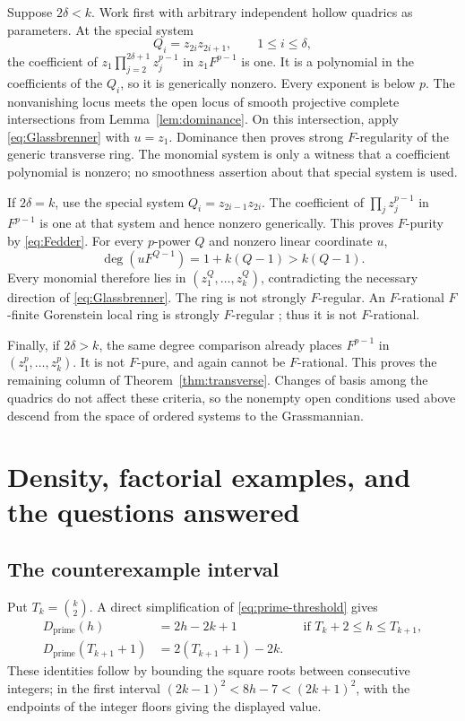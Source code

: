 \documentclass[11pt]{article}
\theoremstyle{definition}
\theoremstyle{remark}
\numberwithin{equation}{section}
\newcommand{\Dpr}{D_{\mathrm{prime}}}
\begin{document}
Suppose $2\delta<k$. Work first with arbitrary independent hollow
quadrics as parameters. At the special system
\[
 Q_i=z_{2i}z_{2i+1},\qquad 1\leq i\leq\delta,
\]
the coefficient of
$z_1\prod_{j=2}^{2\delta+1}z_j^{p-1}$ in $z_1F^{p-1}$ is one.
It is a polynomial in the coefficients of the $Q_i$, so it is
generically nonzero. Every exponent is below $p$. The nonvanishing
locus meets the open locus of smooth projective complete intersections
from Lemma~\ref{lem:dominance}. On this intersection, apply
\eqref{eq:Glassbrenner} with $u=z_1$. Dominance then proves strong
$F$-regularity of the generic transverse ring. The monomial system
is only a witness that a coefficient polynomial is nonzero; no
smoothness assertion about that special system is used.

If $2\delta=k$, use the special system
$Q_i=z_{2i-1}z_{2i}$. The coefficient of
$\prod_j z_j^{p-1}$ in $F^{p-1}$ is one at that system and hence
nonzero generically. This proves $F$-purity by \eqref{eq:Fedder}.
For every $p$-power $Q$ and nonzero linear coordinate $u$,
\[
 \deg(uF^{Q-1})=1+k(Q-1)>k(Q-1).
\]
Every monomial therefore lies in $(z_1^Q,\ldots,z_k^Q)$, contradicting
the necessary direction of \eqref{eq:Glassbrenner}. The ring is not
strongly $F$-regular. An $F$-rational $F$-finite Gorenstein local
ring is strongly $F$-regular \cite[Corollary 4.7 and Theorem 5.5]{HH};
thus it is not $F$-rational.

Finally, if $2\delta>k$, the same degree comparison already places
$F^{p-1}$ in $(z_1^p,\ldots,z_k^p)$. It is not $F$-pure, and again
cannot be $F$-rational. This proves the remaining column of
Theorem~\ref{thm:transverse}. Changes of basis among the quadrics do
not affect these criteria, so the nonempty open conditions used above
descend from the space of ordered systems to the Grassmannian.

\section{Density, factorial examples, and the questions answered}\label{sec:density}

\subsection{The counterexample interval}

Put $T_k=\binom k2$. A direct simplification of
\eqref{eq:prime-threshold} gives
\begin{equation}\label{eq:prime-blocks}
 \begin{aligned}
 \Dpr(h)&=2h-2k+1&&\text{if }T_k+2\leq h\leq T_{k+1},\\
 \Dpr(T_{k+1}+1)&=2(T_{k+1}+1)-2k.
 \end{aligned}
\end{equation}
These identities follow by bounding the square roots between consecutive
integers; in the first interval
$(2k-1)^2<8h-7<(2k+1)^2$, with the endpoints of the integer floors
giving the displayed value.
\end{document}
